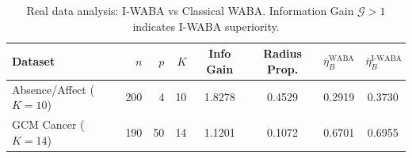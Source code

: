 \begin{table}[ht]
\centering
\caption{Real data analysis: I-WABA vs Classical WABA. Information Gain $\mathcal{G} > 1$ indicates I-WABA superiority.}
\label{tab:real_data}
\begin{tabular}{lrrrcccc}
\toprule
Dataset & $n$ & $p$ & $K$ & Info Gain & Radius Prop. & $\bar{\eta}_B^{\text{WABA}}$ & $\bar{\eta}_B^{\text{I-WABA}}$ \\
\midrule
Absence/Affect ($K=10$) & 200 & 4 & 10 & 1.8278 & 0.4529 & 0.2919 & 0.3730 \\
GCM Cancer ($K=14$) & 190 & 50 & 14 & 1.1201 & 0.1072 & 0.6701 & 0.6955 \\
\bottomrule
\end{tabular}
\end{table}